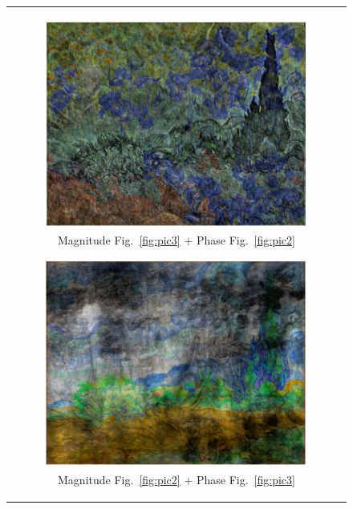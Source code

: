 \documentclass[hidelinks,12pt]{article}
\begin{document}
\begin{figure}[!h]
\begin{tabular}{c}
			\begin{subfigure}[h]{0.45\textwidth}
				\centering
				\includegraphics[width=\textwidth]{figures/mag3_phase2_color.PNG}
				\caption{Magnitude Fig.~\ref{fig:pic3} + Phase Fig.~\ref{fig:pic2}}
			\end{subfigure}
			\hfill
			\begin{subfigure}[h]{0.45\textwidth}
				\centering
				\includegraphics[width=\textwidth]{figures/mag2_phase3_color.PNG}
				\caption{Magnitude Fig.~\ref{fig:pic2} + Phase Fig.~\ref{fig:pic3}}
			\end{subfigure}
		\end{tabular}
		\caption{}
		\label{fig:mixed_phase_mag}
	\end{figure}
	
\end{document}
